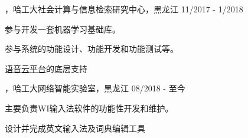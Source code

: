 
\begin{cventries}

\cvexperience
{，哈工大社会计算与信息检索研究中心，黑龙江}
{11/2017 - 1/2018}
{
    \begin{cvitems}
    \item {参与开发一套机器学习基础库。}
    \item {参与系统的功能设计、功能开发和功能测试等。}
    \item {\href{https://www.ltp-cloud.com/}{语音云平台}的底层支持}
    \end{cvitems}
}

\cvexperience
{，哈工大网络智能实验室，黑龙江}
{08/2018 - 至今}
{
    \begin{cvitems}
    \item {主要负责WI输入法软件的功能性开发和维护。}
    \item {设计并完成英文输入法及词典编辑工具}
    \end{cvitems}
}

\end{cventries}